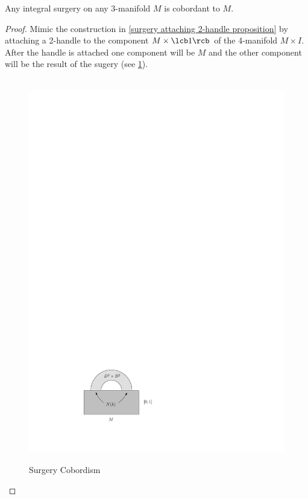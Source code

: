 \begin{cor}
\label{surgery cobordism proposition}
Any integral surgery on any 3-manifold $M$ is cobordant to $M$.
\end{cor}
\begin{proof}
Mimic the construction in \cref{surgery attaching 2-handle proposition} by attaching a 2-handle to the component $M \times \lcb 1 \rcb$ of the 4-manifold $M \times I$. After the handle is attached one component will be $M$ and the other component will be the result of the sugery (see \cref{surgery cobordism figure}).

\begin{figure}[tb]
\centering
\ \ \ \ \ \ \ \ \ \ \ \includegraphics[scale=1.3]{graphics/surgery-cobordism}
\caption{Surgery Cobordism}
\label{surgery cobordism figure}
\end{figure}
\end{proof}

